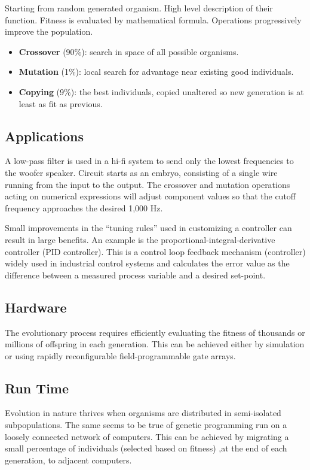 \documentclass[../main.tex]{subfiles}
\begin{document}
Starting from random generated organism. High level description of their function. Fitness is evaluated by mathematical
formula. Operations progressively improve the population.

\begin{itemize}
	\item \textbf{Crossover} (90\%): search in space of all possible organisms.
	\item \textbf{Mutation} (1\%): local search for advantage near existing good individuals.
	\item \textbf{Copying} (9\%): the best individuals, copied unaltered so new generation is at least as fit as
	previous.
\end{itemize}

\subsection{Applications}

\begin{ex}
A low-pass filter is used in a hi-fi system to send only the lowest frequencies to the woofer speaker. Circuit starts
as an embryo, consisting of a single wire running from the input to the output. The crossover and mutation operations
acting on numerical expressions will adjust component values so that the cutoff frequency approaches the desired 1,000
Hz.
\end{ex}

\begin{ex}
Small improvements in the ``tuning rules'' used in customizing a controller can result in large benefits. An example is
the proportional-integral-derivative controller (PID controller). This is a control loop feedback mechanism
(controller) widely used in industrial control systems and calculates  the error value as the difference between a
measured process variable and a desired set-point.
\end{ex}

\subsection{Hardware}
The evolutionary process requires efficiently evaluating the fitness of thousands or millions of offspring in each
generation. This can be achieved either by simulation or using rapidly reconfigurable field-programmable gate arrays.

\subsection{Run Time}
Evolution in nature thrives when organisms are distributed in semi-isolated subpopulations. The same seems to be true
of genetic programming run on a loosely connected network of computers. This can be achieved by migrating a small
percentage of individuals (selected based on fitness) ,at the end of each generation, to adjacent computers.
\end{document}
